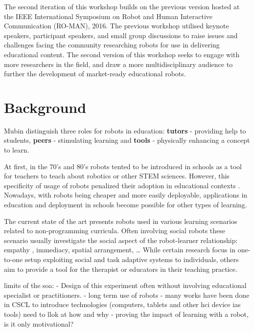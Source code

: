 \documentclass{sig-alternate-05-2015}
\begin{document}
The second iteration of this workshop builds on the previous version hosted at 
the IEEE International Symposium on Robot and Human Interactive Communication 
(RO-MAN), 2016. The previous workshop utilised keynote speakers, participant 
speakers, and small group discussions to raise issues and challenges facing the 
community researching robots for use in delivering educational content. The 
second version of this workshop seeks to engage with more researchers in the 
field, and draw a more multidisciplinary audience to further the development of 
market-ready educational robots.

\section{Background}


Mubin \cite{mubin2013review} distinguish three roles for robots in education:
\textbf{tutors} - providing help to students, \textbf{peers} - stimulating learning and \textbf{tools} - physically enhancing a concept to learn.

At first, in the 70's and 80's robots tented to be introduced in schools as a tool for teachers to teach about robotics or other STEM sciences. 
However, this specificity of usage of robots penalized their adoption in educational contexts \cite{}. 
Nowadays, with robots being cheaper and more easily deployable, applications in education and deployment in schools become possible for other types of learning.  


The current state of the art presents robots used in various learning scenarios related to non-programming curricula. 
Often involving social robots these scenario usually investigate the social aspect of the robot-learner relationship: empathy \cite{castellano2013towards}, immediacy, spatial arrangement\cite{}, \dots
While certain research focus in one-to-one setup \cite{} exploiting social and task adaptive systems to individuals, others aim to provide a tool for the therapist or educators in  their teaching practice\cite{}. 

limits of the soa:
- Design of this experiment often without involving educational specialist or practitioners. 
- long term use of robots
- many works have been done in CSCL to introduce technologies (computers, tablets and other hci device ias tools) need to llok at how and why
- proving the impact of learning with a robot, is it only motivational?
\end{document}
